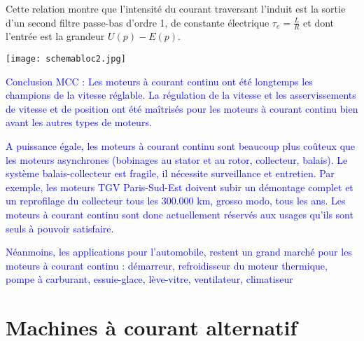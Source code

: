 \documentclass{article}
\begin{document}
Cette relation montre que l'intensité du courant traversant l'induit est la sortie d'un second filtre passe-bas d'ordre 1, de constante électrique $\tau_e = \frac{L}{R}$ et dont l'entrée est la grandeur $U(p) - E(p)$.

\begin{center}
    \texttt{[image: schemabloc2.jpg]}
\end{center}


\textcolor{blue}{Conclusion MCC : Les moteurs à courant continu ont été longtemps les champions de la vitesse réglable. La régulation de la vitesse et les asservissements de vitesse et de position ont été maîtrisés pour les moteurs à courant continu bien avant les autres types de moteurs.}\medskip

\textcolor{blue}{A puissance égale, les moteurs à courant continu sont beaucoup plus coûteux que les moteurs asynchrones (bobinages au stator et au rotor, collecteur, balais). Le système balais-collecteur est fragile, il nécessite surveillance et entretien. Par exemple, les moteurs TGV Paris-Sud-Est doivent subir un démontage complet et un reprofilage du collecteur tous les $300.000$ km, grosso modo, tous les ans. Les moteurs à courant continu sont donc actuellement réservés aux usages qu'ils sont seuls à pouvoir satisfaire.}\medskip

\textcolor{blue}{Néanmoins, les applications pour l'automobile, restent un grand marché pour les moteurs à courant continu : démarreur, refroidisseur du moteur thermique, pompe à carburant, essuie-glace, lève-vitre, ventilateur, climatiseur}\medskip






\section{Machines à courant alternatif}


\end{document}
